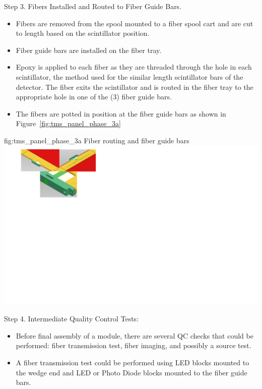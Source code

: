 Step 3.	Fibers Installed and Routed to Fiber Guide Bars. %
\begin{itemize}
\item{Fibers are removed from the spool mounted to a fiber spool cart and are cut to length based on the scintillator position.}
\item{Fiber guide bars are installed on the fiber tray.}
\item{Epoxy is applied to each fiber as they are threaded through the hole in each scintillator, the method used for the similar length scintillator bars of the  detector.  The fiber exits the scintillator and is routed in the fiber tray to the appropriate hole in one of the (3) fiber guide bars.}
\item{The fibers are potted in position at the fiber guide bars as shown in Figure~\ref{fig:tms_panel_phase_3a}}
\end{itemize}

\begin{dunefigure}{fig:tms_panel_phase_3a}
{Fiber routing and fiber guide bars}
\includegraphics[trim= 0 500 0 0 clip, width=2.7\textwidth]{graphics/tms/TMS-Other/phase3a.png}
\end{dunefigure}

Step 4.	Intermediate Quality Control Tests:
\begin{itemize}
\item{Before final assembly of a module, there are several QC checks that could be performed: fiber transmission test, fiber imaging, and possibly a source test.}
\item{A fiber transmission test could be performed using LED blocks mounted to the wedge end
and LED or Photo Diode blocks mounted to the fiber guide bars.}
\end{itemize}


